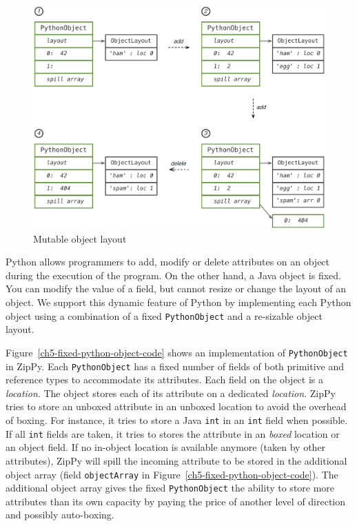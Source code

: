 \begin{figure}
\centering
\includegraphics[scale=.6]{figures/ch5-mutable-object-layout-change}
\caption{Mutable object layout}
\label{ch5-mutable-object-layout-change}
\end{figure}

Python allows programmers to add, modify or delete attributes on an object during the execution of the program.
On the other hand, a Java object is fixed.
You can modify the value of a field, but cannot resize or change the layout of an object.
We support this dynamic feature of Python by implementing each Python object using a combination of a fixed \texttt{PythonObject} and a re-sizable object layout.

Figure~\ref{ch5-fixed-python-object-code} shows an implementation of \texttt{PythonObject} in ZipPy.
Each \texttt{PythonObject} has a fixed number of fields of both primitive and reference types to accommodate its attributes.
Each field on the object is a \emph{location}.
The object stores each of its attribute on a dedicated \emph{location}.
ZipPy tries to store an unboxed attribute in an unboxed location to avoid the overhead of boxing.
For instance, it tries to store a Java \texttt{int} in an \texttt{int} field when possible.
If all \texttt{int} fields are taken, it tries to stores the attribute in an \emph{boxed} location or an object field.
If no in-object location is available anymore (taken by other attributes), ZipPy will spill the incoming attribute to be stored in the additional object array (field \texttt{objectArray} in Figure~\ref{ch5-fixed-python-object-code}).
The additional object array gives the fixed \texttt{PythonObject} the ability to store more attributes than its own capacity by paying the price of another level of direction and possibly auto-boxing.

